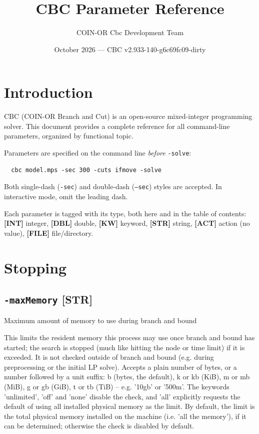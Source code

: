 \documentclass[11pt,a4paper]{article}
\title{CBC Parameter Reference}
\author{COIN-OR Cbc Development Team}
\date{October 2026 --- CBC v2.933-140-g6c69fc09-dirty}
\newcommand{\ptag}[2]{{\scriptsize\textcolor{#1}{\textbf{[#2]}}}}
\begin{document}
\maketitle
\tableofcontents
\newpage

\section*{Introduction}

CBC (COIN-OR Branch and Cut) is an open-source mixed-integer programming
solver.  This document provides a complete reference for all command-line
parameters, organized by functional topic.

Parameters are specified on the command line \emph{before} \texttt{-solve}:
\begin{verbatim}
  cbc model.mps -sec 300 -cuts ifmove -solve
\end{verbatim}

Both single-dash (\texttt{-sec}) and double-dash (\texttt{--sec}) styles
are accepted.  In interactive mode, omit the leading dash.

Each parameter is tagged with its type, both here and in the table of
contents: \ptag{blue!60!black}{INT} integer, \ptag{violet!65!black}{DBL}
double, \ptag{teal!70!black}{KW} keyword, \ptag{orange!80!black}{STR}
string, \ptag{red!65!black}{ACT} action (no value), \ptag{gray!60!black}{FILE}
file/directory.

\section{Stopping}

\subsection*{\texttt{-maxMemory} \ptag{orange!80!black}{STR}}
\addcontentsline{toc}{subsection}{\texttt{-maxMemory} \ptag{orange!80!black}{STR}}

Maximum amount of memory to use during branch and bound

This limits the resident memory this process may use once branch and bound has started; the search is stopped (much like hitting the node or time limit) if it is exceeded. It is not checked outside of branch and bound (e.g. during preprocessing or the initial LP solve). Accepts a plain number of bytes, or a number followed by a unit suffix: b (bytes, the default), k or kb (KiB), m or mb (MiB), g or gb (GiB), t or tb (TiB) -- e.g. '10gb' or '500m'. The keywords 'unlimited', 'off' and 'none' disable the check, and 'all' explicitly requests the default of using all installed physical memory as the limit. By default, the limit is the total physical memory installed on the machine (i.e. 'all the memory'), if it can be determined; otherwise the check is disabled by default.
\end{document}
